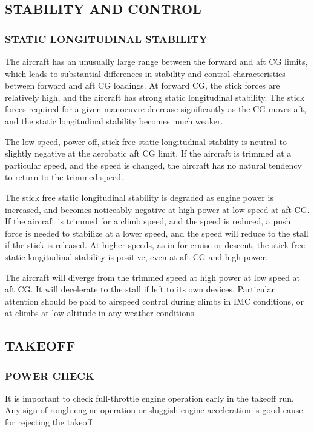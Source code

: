 \subsection{STABILITY AND CONTROL}
  \subsubsection{STATIC LONGITUDINAL STABILITY}
  The aircraft has an unusually large range between the forward and aft CG limits, which leads to substantial differences in stability and control characteristics between forward and aft CG loadings. At forward CG, the stick forces are relatively high, and the aircraft has strong static longitudinal stability. The stick forces required for a given manoeuvre decrease significantly as the CG moves aft, and the static longitudinal stability becomes much weaker. 
  
The low speed, power off, stick free static longitudinal stability is neutral to slightly negative at the aerobatic aft CG limit. If the aircraft is trimmed at a particular speed, and the speed is changed, the aircraft has no natural tendency to return to the trimmed speed. 
  
The stick free static longitudinal stability is degraded as engine power is increased, and becomes noticeably negative at high power at low speed at aft CG. If the aircraft is trimmed for a climb speed, and the speed is reduced, a push force is needed to stabilize at a lower speed, and the speed will reduce to the stall if the stick is released. At higher speeds, as in for cruise or descent, the stick free static longitudinal stability is positive, even at aft CG and high power.
  
\begin{Note}[WARNING]
The aircraft will diverge from the trimmed speed at high power at low speed at aft CG. It will decelerate to the stall if left to its own devices. Particular attention should be paid to airspeed control during climbs in IMC conditions, or at climbs at low altitude in any weather conditions.
\end{Note}

\subsection{TAKEOFF}
  \subsubsection{POWER CHECK}
    It is important to check full-throttle engine operation early in the takeoff run. Any sign of rough engine operation or sluggish engine acceleration is good cause for rejecting the takeoff.
    
